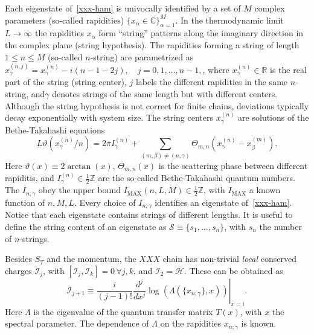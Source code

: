 \documentclass[twocolumn,superscriptaddress,prb,10pt]{revtex4-1}
\begin{document}
Each eigenstate of~\eqref{xxx-ham} is univocally identified by a set of $M$ 
complex parameters (so-called rapidities) $\{x_\alpha\in\mathbb{C}
\}_{\alpha=1}^M$. 
In the thermodynamic limit $L\to\infty$ the rapidities ${x_\alpha}$ form 
``string'' patterns along the imaginary direction in the complex plane 
(string hypothesis). The rapidities forming a string of length $1\le 
n\le M$ (so-called $n$-string) are parametrized as $x_\gamma^{(n,j)}=
x_\gamma^{(n)}-i(n-1-2j),\quad j=0,1,\dots,n-1,$, where $x_\gamma^{(n)}
\in\mathbb{R}$ is the real part of the string (string center), $j$ labels 
the different rapidities in the same $n$-string, and$\gamma$ denotes 
strings of the same length but with different centers. Although the 
string hypothesis is not correct for finite chains, deviations typically 
decay exponentially with system size. The string centers $x_\gamma^{(n)}$ 
are solutions of the Bethe-Takahashi equations 
%
\begin{equation}
L\vartheta(x_\gamma^{(n)}/n)=2\pi I_\gamma^{(n)}+\sum\limits_{(m,\beta)
\ne(n,\gamma)}\Theta_{m,n}(x_\gamma^{(n)}-x_\beta^{(m)}).
\label{bt-eq}
\end{equation}
%
Here $\vartheta(x)\equiv2\arctan(x)$, $\Theta_{m,n}(x)$ is the scattering 
phase between different rapiditis, and $I_{\gamma}^{(n)}\in\frac{1}{2}
\mathbb{Z}$ are the so-called Bethe-Takahashi quantum numbers. 
The $I_{n;\gamma}$ obey the upper bound $I_{\textrm{MAX}}(n,L,M)\in
\frac{1}{2}\mathbb{Z}$, with $I_{\textrm{MAX}}$ a known function of 
$n,M,L$. Every choice of $I_{n;\gamma}$ identifies an eigenstate 
of~\eqref{xxx-ham}. Notice that each eigenstate contains strings of 
different lengths. It is useful to define the string content of an 
eigenstate as ${\mathcal S}\equiv\{s_1,\dots,s_n\}$, with $s_n$ the 
number of $n$-strings. 

Besides $S_T$ and the momentum, the $XXX$ chain has non-trivial 
{\it local} conserved charges ${\mathcal I}_j$, with $[{\mathcal I}_j,
{\mathcal I}_k]=0\,\forall j,k$, and ${\mathcal I}_2={\mathcal H}$. 
These can be obtained as  
%
\begin{equation}
\label{I-def}
\left.{\mathcal I}_{j+1}\equiv\frac{i}{(j-1)!}\frac{d^j}{dx^j}\log(\Lambda
(\{x_{n;\gamma}\},x))
\right|_{x=i}.
\end{equation}
%
Here $\Lambda$ is the eigenvalue of the quantum transfer matrix $T(x)$, with 
$x$ the spectral parameter. The dependence of $\Lambda$ on the rapidities 
$x_{n;\gamma}$ is known. 
\end{document}
